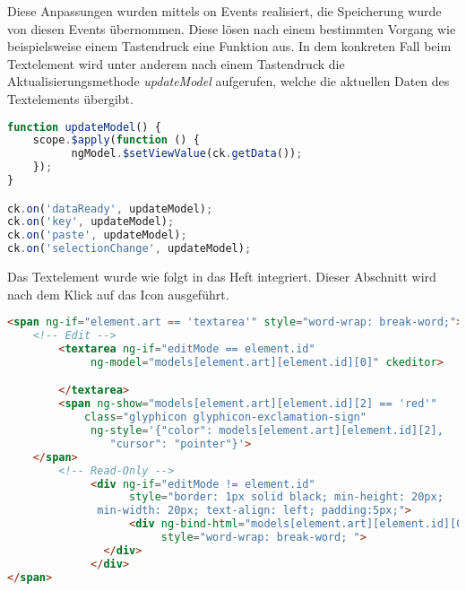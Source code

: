 Diese Anpassungen wurden mittels on Events realisiert, die Speicherung wurde von diesen Events übernommen. Diese lösen nach einem bestimmten Vorgang wie beispielsweise einem Tastendruck eine Funktion aus. In dem konkreten Fall beim Textelement wird unter anderem nach einem Tastendruck die Aktualisierungsmethode \textit{updateModel} aufgerufen, welche die aktuellen Daten des Textelements übergibt.
\begin{lstlisting}[caption={Speicherung des Textelements}, language=Javascript]
function updateModel() {
	scope.$apply(function () {
          ngModel.$setViewValue(ck.getData());
    });
}

ck.on('dataReady', updateModel);
ck.on('key', updateModel);
ck.on('paste', updateModel);
ck.on('selectionChange', updateModel);
\end{lstlisting}

Das Textelement wurde wie folgt in das Heft integriert. Dieser Abschnitt wird nach dem Klick auf das Icon ausgeführt.
\begin{lstlisting}[caption={Einbindung des Textelements}, language=HTML]
<span ng-if="element.art == 'textarea'" style="word-wrap: break-word;">
	<!-- Edit -->
        <textarea ng-if="editMode == element.id"
             ng-model="models[element.art][element.id][0]" ckeditor>

        </textarea>
        <span ng-show="models[element.art][element.id][2] == 'red'"
        	class="glyphicon glyphicon-exclamation-sign"
             ng-style='{"color": models[element.art][element.id][2],
             	"cursor": "pointer"}'>
	</span>
        <!-- Read-Only -->
             <div ng-if="editMode != element.id"
                   style="border: 1px solid black; min-height: 20px; 
			  min-width: 20px; text-align: left; padding:5px;">
                   <div ng-bind-html="models[element.art][element.id][0]"
                   		style="word-wrap: break-word; ">
	           </div>
             </div>
</span>
\end{lstlisting}


